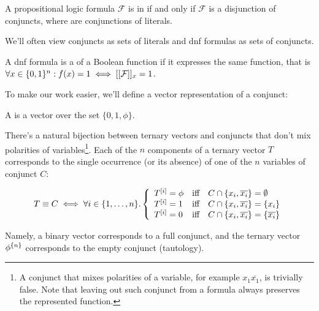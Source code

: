 
\begin{definition}
A propositional logic formula $\mathcal{F}$
is in  if and only if
$\mathcal{F}$ is a disjunction of conjuncts,
where  are conjunctions of literals.

We'll often view conjuncts as sets of literals
and \acrshort{dnf} formulas as sets of conjuncts.
\end{definition}

A \acrshort{dnf} formula is
a 
of a Boolean function
if it expresses the same function,
that is
$\forall x \in \{0, 1\}^n: f(x) = 1 \iff
[[\mathcal{F}]]_{x} = 1$.

To make our work easier,
we'll define a vector representation of a conjunct:

\begin{definition}
A 
is a vector over the set
$\{0, 1, \phi\}$.
\end{definition}

There's a natural bijection between ternary vectors
and conjuncts that don't mix polarities of variables\footnote{A conjunct
that mixes polarities of a variable,
for example $x_1 \overline{x_1}$,
is trivially false.
Note that leaving out such conjunct from a formula
always preserves the represented function.}.
Each of the $n$ components of a ternary vector $T$
corresponds to the single occurrence (or its absence)
of one of the $n$ variables of conjunct $C$:

\[
T \equiv C \iff \forall i \in \{1, \ldots, n\}.
\left\{
  \begin{array}{lll}
    T^{[i]} = \phi & \text{iff} & C \cap \{x_i, \overline{x_i}\} = \emptyset \\
    T^{[i]} = 1 & \text{iff} & C \cap \{x_i, \overline{x_i}\} = \{x_i\} \\
    T^{[i]} = 0 & \text{iff} & C \cap \{x_i, \overline{x_i}\} = \{\overline{x_i}\}
  \end{array}
\right.
\]

Namely,
a binary vector corresponds to a full conjunct,
and the ternary vector $\phi^{\{n\}}$
corresponds to the empty conjunct (tautology).

